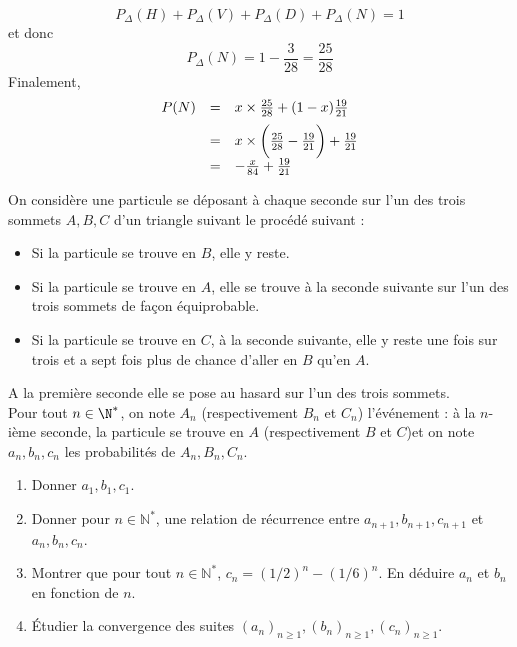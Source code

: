 \documentclass[a4paper,twoside,french,10pt]{VcCours}
\begin{document}
\begin{enumerate}
\begin{enumerate}
\[ P_{\Delta}(H) + P_{\Delta}(V) + P_{\Delta}(D) + P_{\Delta}(N) = 1 \]
et donc 
\[ P_{\Delta}(N) = 1 - \frac{3}{28} = \frac{25}{28} \]
Finalement,
\[ \begin{array}{ccl}
P(N) & = & x \times \frac{25}{28}+ (1-x) \frac{19}{21} \\[0.2cm]
& = & x \times \bigg{(} \frac{25}{28} - \frac{19}{21} \bigg{)} + \frac{19}{21} \\[0.2cm]
& = & - \frac{x}{84} + \frac{19}{21} \\
\end{array}\]
\end{enumerate}
\end{enumerate}



\begin{Exercice}{} On considère une particule se déposant à chaque seconde sur l'un des trois sommets $A,B,C$ d'un triangle suivant le procédé suivant :

\vspace{0.3cm}

\begin{itemize}
 \item Si la particule se trouve en $B$, elle y reste.
 \item Si la particule se trouve en $A$, elle se trouve à la seconde suivante sur l'un des trois sommets de façon équiprobable.
 \item Si la particule se trouve en $C$, à la seconde suivante, elle y reste une fois sur trois et a sept fois plus de chance d'aller en $B$ qu'en $A$.
\end{itemize}

\vspace{0.3cm}

\noindent A la première seconde elle se pose au hasard sur l'un des trois sommets.\\
Pour tout $n\in \N^*$, on note $A_n$ (respectivement $B_n$ et $C_n$) l'événement : \og à la $n$-ième seconde, la particule se trouve en $A$ (respectivement $B$ et $C$)\fg et on note $a_n, b_n, c_n$ les probabilités de $A_n, B_n, C_n$.

\vspace{0.3cm}

\begin{enumerate}
 \item Donner $a_1, b_1, c_1$.
 \item Donner pour $n \in \mathbb{N}^*$, une relation de récurrence entre $a_{n+1}, b_{n+1}, c_{n+1}$ et $a_n, b_n, c_n$.
 \item Montrer que pour tout $n \in \mathbb{N}^*$, $c_n = (1/2)^n-(1/6)^n$. En déduire $a_n$ et $b_n$ en fonction de $n$.
 \item Étudier la convergence des suites $(a_n)_{n \geq 1}, (b_n)_{n \geq 1}, (c_n)_{n \geq 1}$.
\end{enumerate}
\end{Exercice}
\end{document}
